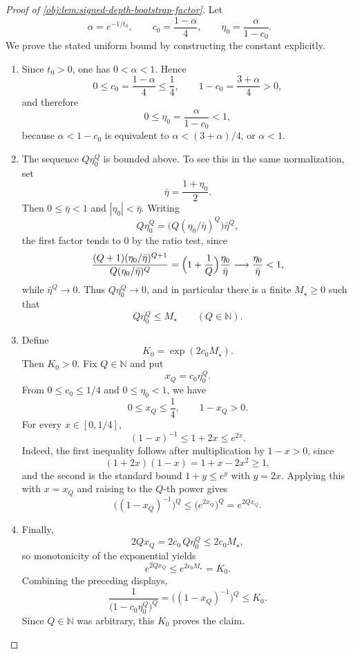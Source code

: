 \begin{proof}[Proof of \cref{obj:lem:signed-depth-bootstrap-factor}]
Let
\[
        \alpha=e^{-1/t_0},\qquad c_0=\frac{1-\alpha}{4},\qquad
        \eta_0=\frac{\alpha}{1-c_0}.
\]
We prove the stated uniform bound by constructing the constant explicitly.

\begin{enumerate}
\item Since \(t_0>0\), one has \(0<\alpha<1\). Hence
\[
        0\le c_0=\frac{1-\alpha}{4}\le \frac14,
        \qquad
        1-c_0=\frac{3+\alpha}{4}>0,
\]
and therefore
\[
        0\le \eta_0=\frac{\alpha}{1-c_0}<1,
\]
because \(\alpha<1-c_0\) is equivalent to \(\alpha<(3+\alpha)/4\), or \(\alpha<1\). %

\item The sequence \(Q\eta_0^Q\) is bounded above. To see this in the same normalization, set
\[
        \bar\eta=\frac{1+\eta_0}{2}.
\]
Then \(0\le \bar\eta<1\) and \(|\eta_0|<\bar\eta\). Writing
\[
        Q\eta_0^Q=\bigl(Q(\eta_0/\bar\eta)^Q\bigr)\bar\eta^Q,
\]
the first factor tends to \(0\) by the ratio test, since
\[
        \frac{(Q+1)(\eta_0/\bar\eta)^{Q+1}}
             {Q(\eta_0/\bar\eta)^Q}
        =\Bigl(1+\frac1Q\Bigr)\frac{\eta_0}{\bar\eta}
        \longrightarrow \frac{\eta_0}{\bar\eta}<1,
\]
while \(\bar\eta^Q\to0\). Thus \(Q\eta_0^Q\to0\), and in particular there is a finite \(M_\star\ge0\) such that
\[
        Q\eta_0^Q\le M_\star\qquad(Q\in\mathbb N).
\]

\item Define
\[
        K_0=\exp(2c_0M_\star).
\]
Then \(K_0>0\). Fix \(Q\in\mathbb N\) and put
\[
        x_Q=c_0\eta_0^Q.
\]
From \(0\le c_0\le1/4\) and \(0\le\eta_0<1\), we have
\[
        0\le x_Q\le \frac14,
        \qquad
        1-x_Q>0.
\]
For every \(x\in[0,1/4]\),
\[
        (1-x)^{-1}\le 1+2x\le e^{2x}.
\]
Indeed, the first inequality follows after multiplication by \(1-x>0\), since
\[
        (1+2x)(1-x)=1+x-2x^2\ge1,
\]
and the second is the standard bound \(1+y\le e^y\) with \(y=2x\). Applying this with \(x=x_Q\) and raising to the \(Q\)-th power gives
\[
        \bigl((1-x_Q)^{-1}\bigr)^Q
        \le \bigl(e^{2x_Q}\bigr)^Q
        =e^{2Qx_Q}.
\]

\item Finally,
\[
        2Qx_Q=2c_0\,Q\eta_0^Q\le 2c_0M_\star,
\]
so monotonicity of the exponential yields
\[
        e^{2Qx_Q}\le e^{2c_0M_\star}=K_0.
\]
Combining the preceding displays,
\[
\frac{1}{\bigl(1-c_0\eta_0^Q\bigr)^Q}
=
\bigl((1-x_Q)^{-1}\bigr)^Q
\le
K_0.
\]
Since \(Q\in\mathbb N\) was arbitrary, this \(K_0\) proves the claim. %
\end{enumerate}
\end{proof}
